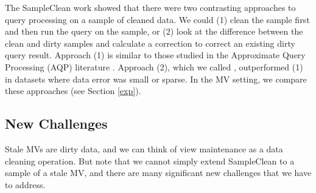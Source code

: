 The SampleClean work showed that there were two contrasting approaches to query processing on a sample of cleaned data.
We could (1) clean the sample first and then run the query on the sample, or (2) look at the difference between the clean and dirty samples and calculate a correction to correct an existing dirty query result. 
Approach (1) is similar to those studied in the Approximate Query Processing (AQP) literature \cite{OlkenR86,AgarwalMPMMS13, joshi2008materialized}.
Approach (2), which we called \nsc, outperformed (1) in datasets where data error was small or sparse.
In the MV setting, we compare these approaches (see Section \ref{exp}). 


\subsection{New Challenges}
Stale MVs are dirty data, and we can think of view maintenance as a data cleaning operation.
But note that we cannot simply extend SampleClean to a sample of a stale MV, and there are many significant new challenges that we have to address.

